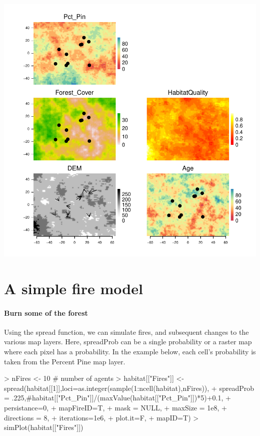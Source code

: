 \documentclass{article}
\begin{document}
\includegraphics{introduction-mobile-point-agent}

\section{A simple fire model}
\paragraph{Burn some of the forest}
Using the spread function, we can simulate fires, and subsequent changes to the various map layers. Here, spreadProb can be a single probability or a raster map where each pixel has a probability. In the example below, each cell's probability is taken from the Percent Pine map layer.


\begin{Schunk}
\begin{Sinput}
> nFires <- 10 # number of agents
> habitat[["Fires"]] <- spread(habitat[[1]],loci=as.integer(sample(1:ncell(habitat),nFires)),
+                              spreadProb = .225,#habitat[["Pct_Pin"]]/(maxValue(habitat[["Pct_Pin"]])*5)+0.1,
+                              persistance=0,
+                              mapFireID=T,
+                              mask = NULL,
+                              maxSize = 1e8,
+                              directions = 8,
+                              iterations=1e6,
+                              plot.it=F,
+                              mapID=T)
> simPlot(habitat[["Fires"]])
\end{Sinput}
\end{Schunk}
\end{document}
